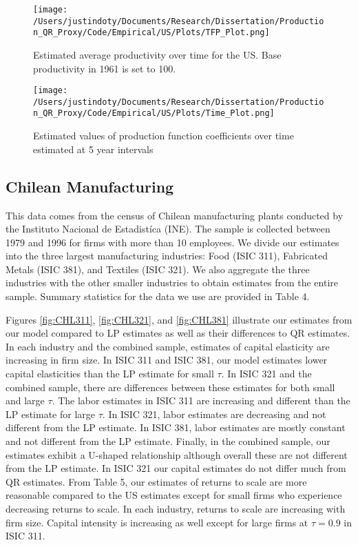 \documentclass[11pt]{article}
\begin{document}
\begin{figure}[H]
\centering
\texttt{[image: /Users/justindoty/Documents/Research/Dissertation/Production\_QR\_Proxy/Code/Empirical/US/Plots/TFP\_Plot.png]}
\caption{Estimated average productivity over time for the US. Base productivity in 1961 is set to 100.}
\label{fig:USpgrowth}
\end{figure}

\begin{figure}[H]
\centering
\texttt{[image: /Users/justindoty/Documents/Research/Dissertation/Production\_QR\_Proxy/Code/Empirical/US/Plots/Time\_Plot.png]}
\caption{Estimated values of production function coefficients over time estimated at 5 year intervals}
\label{fig:UStimecoef}
\end{figure}



\subsection{Chilean Manufacturing}
This data comes from the census of Chilean manufacturing plants conducted by the Instituto Nacional de Estadist\'ica (INE). The sample is collected between 1979 and 1996 for firms with more than 10 employees. We divide our estimates into the three largest manufacturing industries: Food (ISIC 311), Fabricated Metals (ISIC 381), and Textiles (ISIC 321). We also aggregate the three industries with the other smaller industries to obtain estimates from the entire sample. Summary statistics for the data we use are provided in Table 4.

Figures \ref{fig:CHL311}, \ref{fig:CHL321}, and \ref{fig:CHL381} illustrate our estimates from our model compared to LP estimates as well as their differences to QR estimates. In each industry and the combined sample, estimates of capital elasticity are increasing in firm size. In ISIC 311 and ISIC 381, our model estimates lower capital elasticities than the LP estimate for small $\tau$. In ISIC 321 and the combined sample, there are differences between these estimates for both small and large $\tau$. The labor estimates in ISIC 311 are increasing and different than the LP estimate for large $\tau$. In ISIC 321, labor estimates are decreasing and not different from the LP estimate. In ISIC 381, labor estimates are mostly constant and not different from the LP estimate. Finally, in the combined sample, our estimates exhibit a U-shaped relationship although overall these are not different from the LP estimate. In ISIC 321 our capital estimates do not differ much from QR estimates. From Table 5, our estimates of returns to scale are more reasonable compared to the US estimates except for small firms who experience decreasing returns to scale. In each industry, returns to scale are increasing with firm size. Capital intensity is increasing as well except for large firms at $\tau=0.9$ in ISIC 311.
\end{document}
